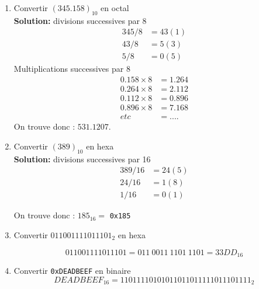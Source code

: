 \documentclass[a4paper,11pt]{article}
\begin{document}
\begin{enumerate}
On trouve $0.2=\underline{0011}...$ (la barre indique la période)

\item Convertir $(345.158 )_{10}$ en octal\\
{\bf Solution:} divisions successives par 8
\begin{align}
  345 / 8 &= 43 (1) \nonumber \\
  43  / 8 &= 5  (3) \nonumber \\
   5  / 8 &= 0  (5)
\end{align}
 Multiplications successives par 8
\begin{align}
  0.158 \times 8 &= 1.264 \nonumber \\
  0.264 \times 8 &= 2.112 \nonumber \\
  0.112 \times 8 &= 0.896 \nonumber \\
  0.896 \times 8 &= 7.168 \nonumber \\
  etc &=....
\end{align}
On trouve  donc : $531.1207$.


\item Convertir $(389)_{10}$ en hexa\\
{\bf Solution:} divisions successives par 16
\begin{align}
  389 / 16 &= 24 (5) \nonumber \\
   24  /16 &= 1  (8) \nonumber \\
   1  / 16 &= 0  (1)
\end{align}

On trouve donc : $185_{16}=$ \texttt{0x185}

\item { Convertir $011001111011101_2$ en hexa}

\begin{equation}
  011001111011101=011\ 0011\ 1101\ 1101=33DD_{16}
\end{equation}

\item { Convertir \texttt{0xDEADBEEF} en binaire}
$$DEADBEEF_{16}=11011110101011011011111011101111_2$$




\end{enumerate}
\end{document}
